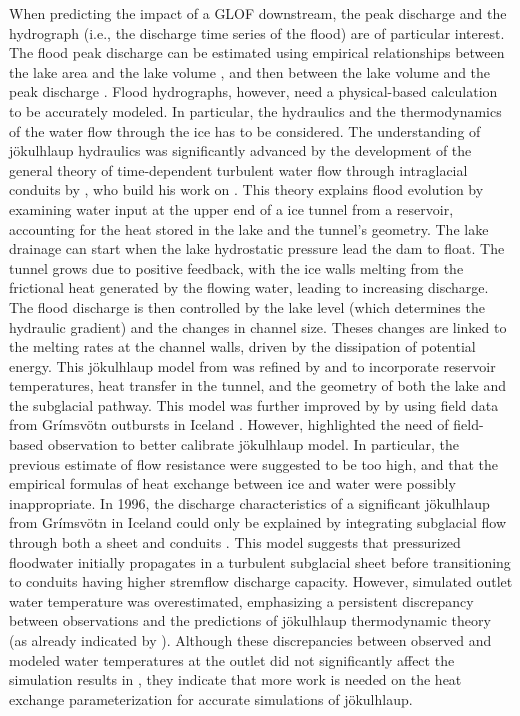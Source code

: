 When predicting the impact of a GLOF downstream, the peak discharge and the hydrograph (i.e., the discharge time series of the flood) are of particular interest. The flood peak discharge can be estimated using empirical relationships between the lake area and the lake volume \citep{Evans1986, Huggel&al2002, Cook&Quincey2015}, and then between the lake volume and the peak discharge \citep{Clague&Mathews1973, Haeberli1983, Costa1985, Evans1986, Walder&OConnor1997, Huggel&al2002}. Flood hydrographs, however, need a physical-based calculation to be accurately modeled. In particular, the hydraulics and the thermodynamics of the water flow through the ice has to be considered. 
The understanding of jökulhlaup hydraulics was significantly advanced by the development of the general theory of time-dependent turbulent water flow through intraglacial conduits by \cite{Nye1976}, who build his work on \cite{Roethlisberger1972,Shreve1972,Weertman1972}. This theory explains flood evolution by examining water input at the upper end of a ice tunnel from a reservoir, accounting for the heat stored in the lake and the tunnel's geometry. The lake drainage can start when the lake hydrostatic pressure lead the dam to float. The tunnel grows due to positive feedback, with the ice walls melting from the frictional heat generated by the flowing water, leading to increasing discharge. The flood discharge is then controlled by the lake level (which determines the hydraulic gradient) and the changes in channel size. Theses changes are linked to the melting rates at the channel walls, driven by the dissipation of potential energy. This jökulhlaup model from \cite{Nye1976} was refined by \cite{Spring&Hutter1981} and \cite{Clarke1982} to incorporate reservoir temperatures, heat transfer in the tunnel, and the geometry of both the lake and the subglacial pathway. This model was further improved by \cite{Clarke2003} by using field data from Grímsvötn outbursts in Iceland \citep[see][]{Bjornsson2010}. However, \cite{Clarke2003} highlighted the need of field-based observation to better calibrate jökulhlaup model. In particular, the previous estimate of flow resistance were suggested to be too high, and that the empirical formulas of heat exchange between ice and water were possibly inappropriate. In 1996, the discharge characteristics of a significant jökulhlaup from Grímsvötn in Iceland \citep{Bjornsson1996} could only be explained by integrating subglacial flow through both a sheet and conduits \citep{Flowers&al2004}. This model suggests that pressurized floodwater initially propagates in a turbulent subglacial sheet before transitioning to conduits having higher stremflow discharge capacity. However, simulated outlet water temperature was overestimated, emphasizing a persistent discrepancy between observations and the predictions of jökulhlaup thermodynamic theory (as already indicated by \cite{Clarke2003}). Although these discrepancies between observed and modeled water temperatures at the outlet did not significantly affect the simulation results in \cite{Flowers&al2004}, they indicate that more work is needed on the heat exchange parameterization for accurate simulations of jökulhlaup.

